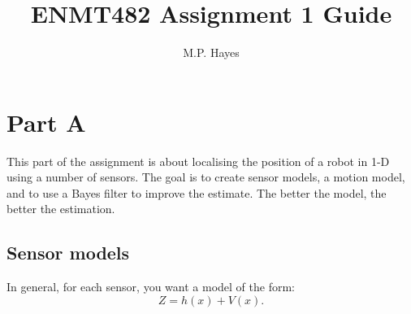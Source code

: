 \documentclass[a4paper, 12pt]{article}
\title{ENMT482 Assignment 1 Guide}
\author{M.P. Hayes}
\date{}
\begin{document}
\maketitle


\section{Part A}

This part of the assignment is about localising the position of a
robot in 1-D using a number of sensors.  The goal is to create sensor
models, a motion model, and to use a Bayes filter to improve the
estimate.  The better the model, the better the estimation.


\subsection{Sensor models}

In general, for each sensor, you want a model of the form:
%
\begin{equation}
  Z = h(x) + V(x).
\end{equation}
\end{document}
